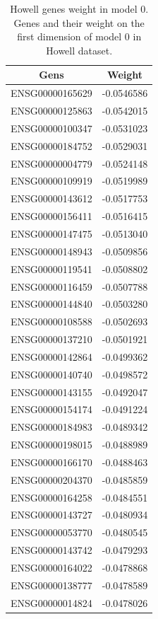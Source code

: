 \documentclass[
  12pt,
  a4paper,
  twoside,
  openright]{book}
\begin{document}
\begin{longtable}[t]{cc}
\caption[Howell genes weight in model 0]{\label{tab:howell-genes}Howell genes weight in model 0. Genes and their weight on the first dimension of model 0 in Howell dataset.}\\
\toprule
Gens & Weight\\
\midrule
ENSG00000165629 & -0.0546586\\
ENSG00000125863 & -0.0542015\\
ENSG00000100347 & -0.0531023\\
ENSG00000184752 & -0.0529031\\
ENSG00000004779 & -0.0524148\\
\addlinespace
ENSG00000109919 & -0.0519989\\
ENSG00000143612 & -0.0517753\\
ENSG00000156411 & -0.0516415\\
ENSG00000147475 & -0.0513040\\
ENSG00000148943 & -0.0509856\\
\addlinespace
ENSG00000119541 & -0.0508802\\
ENSG00000116459 & -0.0507788\\
ENSG00000144840 & -0.0503280\\
ENSG00000108588 & -0.0502693\\
ENSG00000137210 & -0.0501921\\
\addlinespace
ENSG00000142864 & -0.0499362\\
ENSG00000140740 & -0.0498572\\
ENSG00000143155 & -0.0492047\\
ENSG00000154174 & -0.0491224\\
ENSG00000184983 & -0.0489342\\
\addlinespace
ENSG00000198015 & -0.0488989\\
ENSG00000166170 & -0.0488463\\
ENSG00000204370 & -0.0485859\\
ENSG00000164258 & -0.0484551\\
ENSG00000143727 & -0.0480934\\
\addlinespace
ENSG00000053770 & -0.0480545\\
ENSG00000143742 & -0.0479293\\
ENSG00000164022 & -0.0478868\\
ENSG00000138777 & -0.0478589\\
ENSG00000014824 & -0.0478026\\
\bottomrule
\end{longtable}
\end{document}
